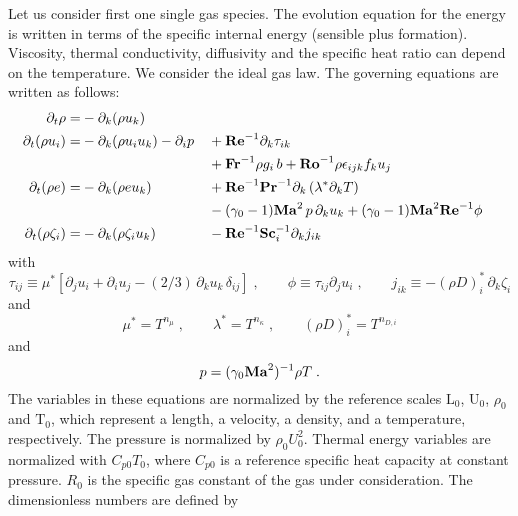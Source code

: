 Let us consider first one single gas species. The evolution equation for the energy is written in terms of the specific internal energy (sensible plus formation). Viscosity, thermal conductivity, diffusivity and the specific heat ratio can depend on the temperature. We consider the ideal gas law. The governing equations are written as follows:
\begin{subequations}
  \begin{align}
    \partial_t \rho       =& -\partial_k (\rho u_k)                                       \\
    \partial_t (\rho u_i) =& -\partial_k (\rho u_i u_k )- \partial_i p
    && +\mathrm{\bf Re}^{-1}\partial_k \tau_{ik}                                            \nonumber \\
    & && +\mathrm{\bf Fr}^{-1} \rho g_i\,b +\mathrm{\bf Ro}^{-1}\rho\epsilon_{ijk} f_ku_j                         \\
    \partial_t (\rho e)   =& -\partial_k (\rho e u_k )
    && +\mathrm{\bf Re}^{-1}\mathrm{\bf Pr}^{-1} \partial_k \left(\lambda^{*}\partial_kT\right)         \nonumber \\
    & &&-(\gamma_0-1)\mathrm{\bf Ma}^2\,p\, \partial_k u_k  + (\gamma_0-1)\mathrm{\bf Ma}^2\mathrm{\bf Re}^{-1}\phi           \\
    \partial_t (\rho \zeta_i) =& -\partial_k (\rho \zeta_i u_k)
    && -\mathrm{\bf Re}^{-1}\mathrm{\bf Sc}_i^{-1} \partial_k j_{ik}
  \end{align}
\end{subequations}
with
\begin{equation}
  \tau_{ij} \equiv \mu^*\left[\partial_j u_i +\partial_i u_j -(2/3)\, \partial_k u_k\,\delta_{ij}\right]\;,\qquad
  \phi      \equiv \tau_{ij} \partial_j u_i\;,\qquad
  j_{ik}    \equiv -(\rho D)_i^{*}\, \partial_k \zeta_i
\end{equation}
and
\begin{equation}
  \mu^{*} =  T^{n_\mu}\;,\qquad \lambda^{*} = T^{n_\kappa} \;,\qquad (\rho D)_i^{*}  =  T^{n_{D,i}}
\end{equation}
and
\begin{equation}
  p  = (\gamma_0 \mathrm{\bf Ma}^2)^{-1}\rho T \;.
  \label{eq:state}
\end{equation}
The variables in these equations are normalized by the reference scales $\mathrm{L}_0$, $\mathrm{U}_0$, $\rho_0$ and $\mathrm{T}_0$, which represent a length, a velocity, a density, and a temperature, respectively. The pressure is normalized by $\rho_0U_0^2$. Thermal energy variables are normalized with $C_{p0}T_0$, where $C_{p0}$ is a reference specific heat capacity at constant pressure. $R_0$ is the specific gas constant of the gas under consideration. The dimensionless numbers are defined by
